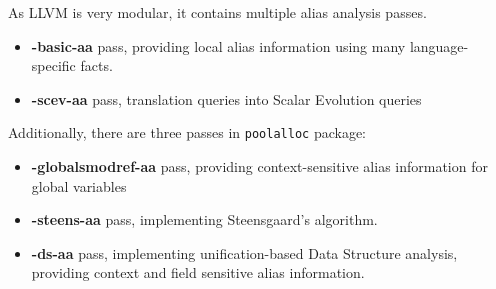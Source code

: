 As LLVM is very modular, it contains multiple alias analysis passes. 

\begin{itemize}
	\item {\bf -basic-aa} pass, providing local alias information using many
		language-specific facts.
	\item {\bf -scev-aa} pass, translation queries into Scalar Evolution queries
\end{itemize}

Additionally, there are three passes in {\tt poolalloc} package:

\begin{itemize}
	\item {\bf -globalsmodref-aa} pass, providing context-sensitive alias
		information for global variables
	\item {\bf -steens-aa} pass, implementing Steensgaard's algorithm.
	\item {\bf -ds-aa} pass, implementing unification-based Data Structure
		analysis, providing context and field sensitive alias information.
\end{itemize}

